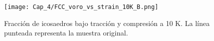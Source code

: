 \begin{figure}[htp]
\centering
\texttt{[image: Cap\_4/FCC\_voro\_vs\_strain\_10K\_B.png]}
\caption[Fracción de icosaedros a 10K]{Fracción de icosaedros bajo tracción y compresión a 10 K. La línea punteada representa la muestra original.}
\label{C4:fg:fcc_voro_10K}
\end{figure}

% 
% 
% 
